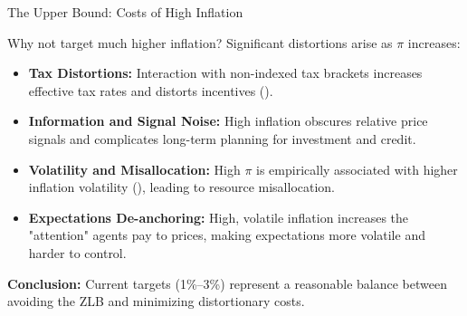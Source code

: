 \documentclass[11pt,aspectratio=169]{beamer}
\begin{document}
\begin{frame}{The Upper Bound: Costs of High Inflation}
\small

Why not target much higher inflation? Significant distortions arise as $\pi$ increases:

\vspace{0.3cm}

\begin{itemize}
    \item \textbf{Tax Distortions:} Interaction with non-indexed tax brackets increases effective tax rates and distorts incentives (\cite{feldstein1997}).
    
    \vspace{0.2cm}
    
    \item \textbf{Information and Signal Noise:} High inflation obscures relative price signals and complicates long-term planning for investment and credit.
    
    \vspace{0.2cm}
    
    \item \textbf{Volatility and Misallocation:} High $\pi$ is empirically associated with higher inflation volatility (\cite{imf2015}), leading to resource misallocation.
    
    \vspace{0.2cm}
    
    \item \textbf{Expectations De-anchoring:} High, volatile inflation increases the "attention" agents pay to prices, making expectations more volatile and harder to control.
\end{itemize}

\vspace{0.3cm}
\textbf{Conclusion:} Current targets (1\%--3\%) represent a reasonable balance between avoiding the ZLB and minimizing distortionary costs.

\end{frame}

\end{document}
